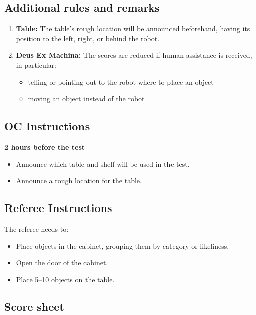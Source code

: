 %
%
\subsection*{Additional rules and remarks}
\begin{enumerate}
	\item \textbf{Table:} The table's rough location will be announced beforehand, having its position to the left, right, or behind the robot.
	\item \textbf{Deus Ex Machina:} The scores are reduced if human assistance is received, in particular:
	\begin{itemize}
		\item telling or pointing out to the robot where to place an object
		\item moving an object instead of the robot
	\end{itemize}
\end{enumerate}

\subsection*{OC Instructions}

\textbf{2 hours before the test}
\begin{itemize}
	\item Announce which table and shelf will be used in the test.
	\item Announce a rough location for the table.
\end{itemize}

\subsection*{Referee Instructions}

The referee needs to:
\begin{itemize}
	\item Place objects in the cabinet, grouping them by category or likeliness.
	\item Open the door of the cabinet.
	\item Place 5--10 objects on the table.
\end{itemize}


\subsection*{Score sheet}


